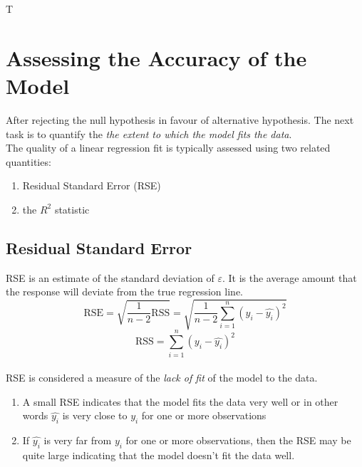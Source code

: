 T\documentclass{article}
\begin{document}
\section*{Assessing the Accuracy of the Model}
After rejecting the null hypothesis in favour of alternative hypothesis. The next task is to quantify the \textit{the extent to which the model fits the data}. \\ The quality of a linear regression fit is typically assessed using two related quantities:
\begin{enumerate}
    \item Residual Standard Error (RSE)
    \item the $R^{2}$ statistic
\end{enumerate}
\subsection*{Residual Standard Error} 
RSE is an estimate of the standard deviation of $\varepsilon$. It is the average amount that the response will deviate from the true regression line. 
\begin{equation*} \text{RSE} = \sqrt{\frac{1}{n-2}\text{RSS}} = \sqrt{\frac{1}{n-2} \sum_{i=1}^{n} {(y_i - \hat{y_i})}^2 } \end{equation*}
\begin{equation*} \text{RSS} = \sum_{i=1}^{n} {(y_i - \hat{y_i})}^2 \end{equation*}
\\[2mm] 
RSE is considered a measure of the \textit{lack of fit} of the model to the data.
\begin{enumerate}
    \item A small RSE indicates that the model fits the data very well or in other words $\hat{y_i}$ is very close to $y_i$ for one or more observations 
    \item If $\hat{y_i}$ is very far from $y_i$ for one or more observations, then the RSE may be quite large indicating that the model doesn't fit the data well.
\end{enumerate}
\vspace{3mm}
\end{document}
